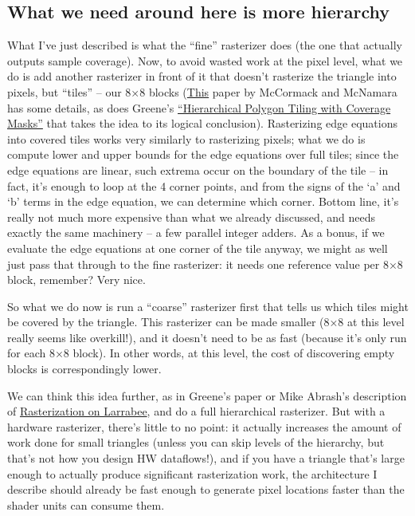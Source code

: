 \documentclass[12pt]{article}
\begin{document}
\subsection{What we need around here is more hierarchy}
\label{sec:org1e298e8}

What I’ve just described is what the “fine” rasterizer does (the one that actually outputs sample coverage). Now, to avoid wasted work at the pixel level, what we do is add another rasterizer in front of it that doesn’t rasterize the triangle into pixels, but “tiles” – our 8×8 blocks (\href{http://people.csail.mit.edu/ericchan/bib/pdf/p15-mccormack.pdf}{This} paper by McCormack and McNamara has some details, as does Greene’s \href{http://citeseerx.ist.psu.edu/viewdoc/download?doi=10.1.1.115.1646\&rep=rep1\&type=pdf}{“Hierarchical Polygon Tiling with Coverage Masks”} that takes the idea to its logical conclusion). Rasterizing edge equations into covered tiles works very similarly to rasterizing pixels; what we do is compute lower and upper bounds for the edge equations over full tiles; since the edge equations are linear, such extrema occur on the boundary of the tile – in fact, it’s enough to loop at the 4 corner points, and from the signs of the ‘a’ and ‘b’ terms in the edge equation, we can determine which corner. Bottom line, it’s really not much more expensive than what we already discussed, and needs exactly the same machinery – a few parallel integer adders. As a bonus, if we evaluate the edge equations at one corner of the tile anyway, we might as well just pass that through to the fine rasterizer: it needs one reference value per 8×8 block, remember? Very nice.

So what we do now is run a “coarse” rasterizer first that tells us which tiles might be covered by the triangle. This rasterizer can be made smaller (8×8 at this level really seems like overkill!), and it doesn’t need to be as fast (because it’s only run for each 8×8 block). In other words, at this level, the cost of discovering empty blocks is correspondingly lower.

We can think this idea further, as in Greene’s paper or Mike Abrash’s description of \href{http://drdobbs.com/architecture-and-design/217200602}{Rasterization on Larrabee}, and do a full hierarchical rasterizer. But with a hardware rasterizer, there’s little to no point: it actually increases the amount of work done for small triangles (unless you can skip levels of the hierarchy, but that’s not how you design HW dataflows!), and if you have a triangle that’s large enough to actually produce significant rasterization work, the architecture I describe should already be fast enough to generate pixel locations faster than the shader units can consume them.
\end{document}
